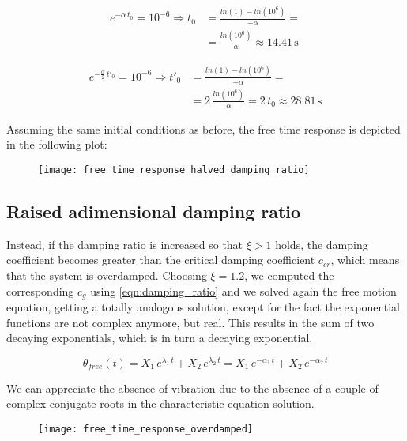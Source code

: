 \documentclass[a4paper,12pt,oneside]{article}
\begin{document}
\[ \begin{split}
	e^{-\alpha \, t_0} = 10^{-6} \Rightarrow %
		t_0 & = \frac{ln(1) - ln(10^6)}{-\alpha} = \\
				& = \frac{ln(10^6)}{\alpha} \approx 14.41 \, \text{s}
\end{split} \]

\[ \begin{split}
	e^{-\frac{\alpha}{2} \, t'_0} = 10^{-6} \Rightarrow %
		t'_0 & = \frac{ln(1) - ln(10^6)}{-\alpha} = \\
				 & = 2 \, \frac{ln(10^6)}{\alpha} = 2 \, t_0 \approx 28.81 \, \text{s}
\end{split} \]

Assuming the same initial conditions as before, the free time response is depicted in the following plot:

\vspace{16pt}

\begin{figure}[h]
	\centering
	\texttt{[image: free\_time\_response\_halved\_damping\_ratio]}
\end{figure}

\clearpage

\subsection{Raised adimensional damping ratio}

Instead, if the damping ratio is increased so that $ \xi > 1 $ holds, the damping coefficient becomes greater than the critical damping coefficient $ c_{cr} $, which means that the system is overdamped. Choosing $ \xi = 1.2 $, we computed the corresponding $ c_g $ using \eqref{eqn:damping_ratio} and we solved again the free motion equation, getting a totally analogous solution, except for the fact the exponential functions are not complex anymore, but real. This results in the sum of two decaying exponentials, which is in turn a decaying exponential.

\[
	\theta_{free}(t) = X_1 \, e^{\lambda_1 \, t} + X_2 \, e^{\lambda_2 \, t} = %
		X_1 \, e^{-\alpha_1 \, t} + X_2 \, e^{-\alpha_2 \, t}
\]

We can appreciate the absence of vibration due to the absence of a couple of complex conjugate roots in the characteristic equation solution.

\vspace{16pt}

\begin{figure}[h]
	\centering
	\texttt{[image: free\_time\_response\_overdamped]}
\end{figure}
\end{document}
